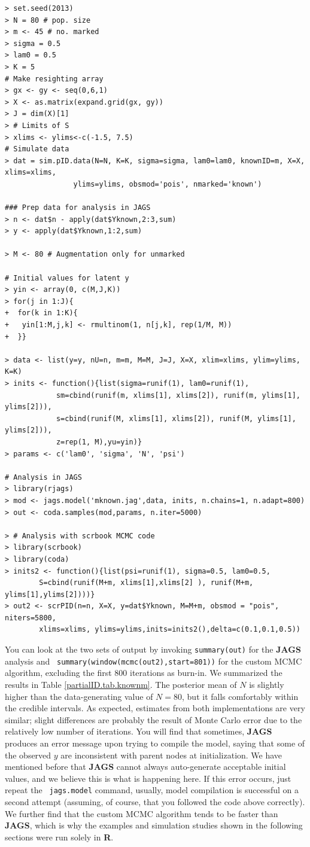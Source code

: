 {\small
\begin{verbatim}
> set.seed(2013)
> N = 80 # pop. size
> m <- 45 # no. marked
> sigma = 0.5
> lam0 = 0.5
> K = 5
# Make resighting array
> gx <- gy <- seq(0,6,1)
> X <- as.matrix(expand.grid(gx, gy))
> J = dim(X)[1]
> # Limits of S
> xlims <- ylims<-c(-1.5, 7.5)
# Simulate data
> dat = sim.pID.data(N=N, K=K, sigma=sigma, lam0=lam0, knownID=m, X=X, xlims=xlims,
				ylims=ylims, obsmod='pois',	nmarked='known')

### Prep data for analysis in JAGS
> n <- dat$n - apply(dat$Yknown,2:3,sum)
> y <- apply(dat$Yknown,1:2,sum)

> M <- 80 # Augmentation only for unmarked

# Initial values for latent y
> yin <- array(0, c(M,J,K))
> for(j in 1:J){
+  for(k in 1:K){
+   yin[1:M,j,k] <- rmultinom(1, n[j,k], rep(1/M, M))
+  }}

> data <- list(y=y, nU=n, m=m, M=M, J=J, X=X, xlim=xlims, ylim=ylims, K=K)
> inits <- function(){list(sigma=runif(1), lam0=runif(1),
			sm=cbind(runif(m, xlims[1], xlims[2]), runif(m, ylims[1], ylims[2])),
			s=cbind(runif(M, xlims[1], xlims[2]), runif(M, ylims[1], ylims[2])),
			z=rep(1, M),yu=yin)}
> params <- c('lam0', 'sigma', 'N', 'psi')

# Analysis in JAGS
> library(rjags)
> mod <- jags.model('mknown.jag',data, inits, n.chains=1, n.adapt=800)
> out <- coda.samples(mod,params, n.iter=5000)

> # Analysis with scrbook MCMC code
> library(scrbook)
> library(coda)
> inits2 <- function(){list(psi=runif(1), sigma=0.5, lam0=0.5,
		S=cbind(runif(M+m, xlims[1],xlims[2] ), runif(M+m, ylims[1],ylims[2])))}
> out2 <- scrPID(n=n, X=X, y=dat$Yknown, M=M+m, obsmod = "pois", niters=5800,
		xlims=xlims, ylims=ylims,inits=inits2(),delta=c(0.1,0.1,0.5))
\end{verbatim}
}
You can look at the two sets of output by invoking {\tt summary(out)}
for the {\bf JAGS} analysis and {\tt
  summary(window(mcmc(out2),start=801))} for the custom MCMC
algorithm, excluding the first 800 iterations as burn-in.  We
summarized the results in Table \ref{partialID.tab.knownm}.  The
posterior mean of $N$ is slightly higher than the data-generating
value of $N=80$, but it falls comfortably within the credible
intervals.  As expected, estimates from both implementations are very
similar; slight differences are probably the result of Monte Carlo
error due to the relatively
low number of iterations.  You will find that sometimes, {\bf JAGS}
produces an error message upon trying to compile the model, saying
that some of the observed $y$ are inconsistent with parent nodes at
initialization. We have mentioned before that {\bf JAGS} cannot always
auto-generate acceptable initial values, and we believe this is what
is happening here. If this error occurs, just repeat the {\tt
  jags.model} command, usually, model compilation is successful on a
second attempt (assuming, of course, that you followed the code above
correctly). We further find that the custom MCMC algorithm tends to be
faster than {\bf JAGS}, which is why the examples and simulation
studies shown in the following sections were run solely in {\bf R}.

